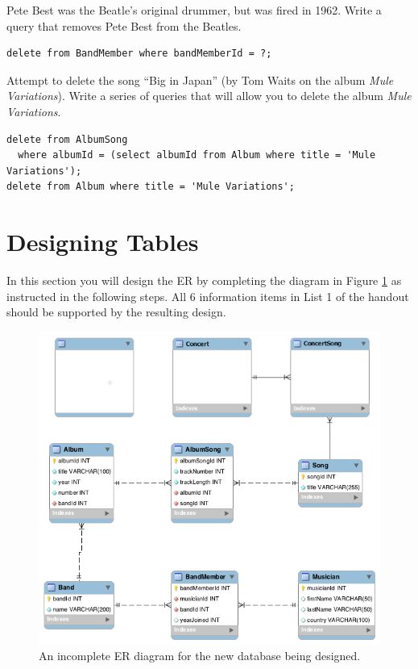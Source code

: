 \documentclass[12pt]{exam}
\begin{document}
\begin{questions}
\question Pete Best was the Beatle's original drummer, but was fired in 1962.  
Write a query that removes Pete Best from the Beatles.

\begin{solution}

\begin{verbatim}
delete from BandMember where bandMemberId = ?;
\end{verbatim}
\end{solution}

\question Attempt to delete the song ``Big in Japan'' (by Tom Waits on the album
\emph{Mule Variations}).  Write a series of queries that will allow you to delete
the album \emph{Mule Variations}.

\begin{solution}

\begin{verbatim}
delete from AlbumSong 
  where albumId = (select albumId from Album where title = 'Mule Variations');
delete from Album where title = 'Mule Variations';
\end{verbatim}
\end{solution}

\end{questions}

\newpage

\section{Designing Tables}

In this section you will design the ER by completing the diagram in Figure 
\ref{figure:erDiagram} as instructed in the following steps. All 6 information 
items in List 1 of the handout should be supported by the resulting design.

\begin{figure}
\centering
\includegraphics[scale=0.65]{images/erDiagram}
\caption{An incomplete ER diagram for the new database being designed.}
\label{figure:erDiagram}
\end{figure} 
\end{document}
